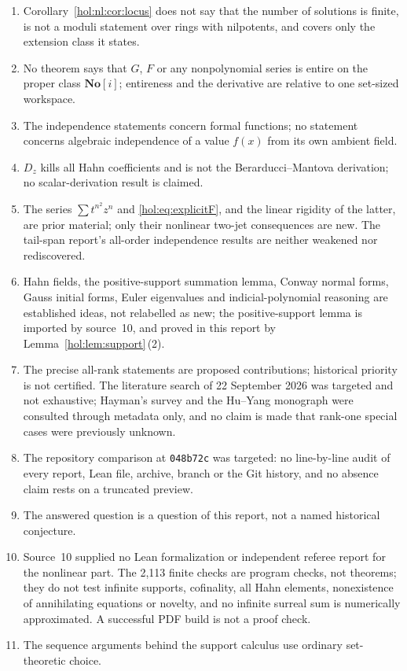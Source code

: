 \documentclass[11pt]{article}
\numberwithin{equation}{section}
\theoremstyle{definition}
\theoremstyle{remark}
\newcommand{\No}{\mathbf{No}}
\begin{document}
\begin{enumerate}[label=\textup{(N\arabic*)}]
certificate.
\item Corollary~\ref{hol:nl:cor:locus} does not say that the number of
solutions is finite, is not a moduli statement over rings with nilpotents,
and covers only the extension class it states.
\item No theorem says that $G$, $F$ or any nonpolynomial series is entire on
the proper class $\No[i]$; entireness and the derivative are relative to one
set-sized workspace.
\item The independence statements concern formal functions; no statement
concerns algebraic independence of a value $f(x)$ from its own ambient field.
\item $D_z$ kills all Hahn coefficients and is not the Berarducci--Mantova
derivation; no scalar-derivation result is claimed.
\item The series $\sum t^{n^2}z^n$ and \eqref{hol:eq:explicitF}, and the
linear rigidity of the latter, are prior material; only their nonlinear
two-jet consequences are new. The tail-span report's all-order independence
results are neither weakened nor rediscovered.
\item Hahn fields, the positive-support summation lemma, Conway normal forms,
Gauss initial forms, Euler eigenvalues and indicial-polynomial reasoning are
established ideas, not relabelled as new; the positive-support lemma is
imported by source~10, and proved in this report by
Lemma~\ref{hol:lem:support}\,(2).
\item The precise all-rank statements are proposed contributions; historical
priority is not certified. The literature search of 22 September 2026 was
targeted and not exhaustive; Hayman's survey and the Hu--Yang monograph were
consulted through metadata only, and no claim is made that rank-one special
cases were previously unknown.
\item The repository comparison at \texttt{048b72c} was targeted: no
line-by-line audit of every report, Lean file, archive, branch or the Git
history, and no absence claim rests on a truncated preview.
\item The answered question is a question of this report, not a named
historical conjecture.
\item Source~10 supplied no Lean formalization or independent referee report
for the nonlinear part. The 2{,}113 finite checks are program checks, not theorems; they
do not test infinite supports, cofinality, all Hahn elements, nonexistence of
annihilating equations or novelty, and no infinite surreal sum is numerically
approximated. A successful PDF build is not a proof check.
\item The sequence arguments behind the support calculus use ordinary
set-theoretic choice.
\end{enumerate}
\end{document}
